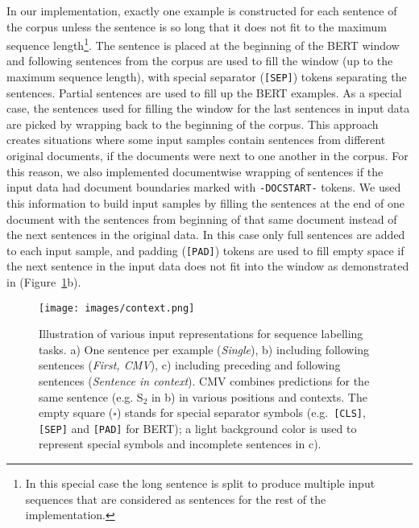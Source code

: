 In our implementation, exactly one example is constructed for each sentence of the corpus unless the sentence is so long that it does not fit to the maximum sequence length\footnote{In this special case the long sentence is split to produce multiple input sequences that are considered as sentences for the rest of the implementation.}. The sentence is placed at the beginning of the BERT window and following sentences from the corpus are used to fill the window (up to the maximum sequence length), with special separator (\texttt{[SEP]}) tokens separating the sentences. Partial sentences are used to fill up the BERT examples. As a special case, the sentences used for filling the window for the last sentences in input data are picked by wrapping back to the beginning of the corpus. This approach creates situations where some input samples contain sentences from different original documents, if the documents were next to one another in the corpus. For this reason, we also implemented documentwise wrapping of sentences if the input data had document boundaries marked with \texttt{-DOCSTART-} tokens. We used this information to build input samples by filling the sentences at the end of one document with the sentences from beginning of that same document instead of the next sentences in the original data. In this case only full sentences are added to each input sample, and padding (\texttt{[PAD]}) tokens are used to fill empty space if the next sentence in the input data does not fit into the window as demonstrated in (Figure~\ref{fig:context}b).

\begin{figure}[!t]
\texttt{[image: images/context.png]}
\caption{Illustration of various input representations for sequence labelling tasks. a) One sentence per example (\emph{Single}), b) including following sentences (\emph{First, CMV}), c) including preceding and following sentences (\emph{Sentence in context}). CMV combines predictions for the same sentence (e.g. $\textrm{S}_2$ in b) in various positions and contexts. The empty square ({\small $\square$}) stands for special separator symbols (e.g.\ \texttt{[CLS]}, \texttt{[SEP]} and \texttt{[PAD]} for BERT); a light background color is used to represent special symbols and incomplete sentences in c).
}
\label{fig:context}
\end{figure}

